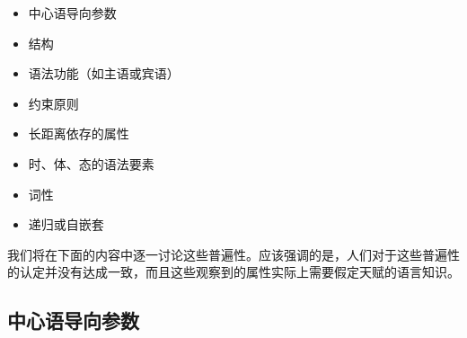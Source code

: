 \begin{itemize}
\item 中心语导向参数
\item \xbarc 结构
\item 语法功能（如主语或宾语）
\item 约束原则
\item 长距离依存的属性
\item 时、体、态的语法要素
\item 词性
\item 递归或自嵌套
\end{itemize}

\noindent
我们将在下面的内容中逐一讨论这些普遍性。应该强调的是，人们对于这些普遍性的认定并没有达成一致，而且这些观察到的属性实际上需要假定天赋的语言知识。

\subsection{中心语导向参数}
\label{Abschnitt-Kopfstellungsparameter}


